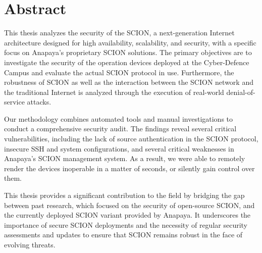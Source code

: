 \chapter*{Abstract}





This thesis analyzes the security of the SCION, a next-generation Internet architecture designed for high availability, scalability, and security, with a specific focus on Anapaya's proprietary SCION solutions.
The primary objectives are to investigate the security of the operation devices deployed at the Cyber-Defence Campus and evaluate the actual SCION protocol in use.
Furthermore, the robustness of SCION as well as the interaction between the SCION network and the traditional Internet is analyzed through the execution of real-world denial-of-service attacks.

Our methodology combines automated tools and manual investigations to conduct a comprehensive security audit.
The findings reveal several critical vulnerabilities, including the lack of source authentication in the SCION protocol, insecure SSH and system configurations, and several critical weaknesses in Anapaya's SCION management system.
As a result, we were able to remotely render the devices inoperable in a matter of seconds, or silently gain control over them.

This thesis provides a significant contribution to the field by bridging the gap between past research, which focused on the security of open-source SCION, and the currently deployed SCION variant provided by Anapaya.
It underscores the importance of secure SCION deployments and the necessity of regular security assessments and updates to ensure that SCION remains robust in the face of evolving threats.